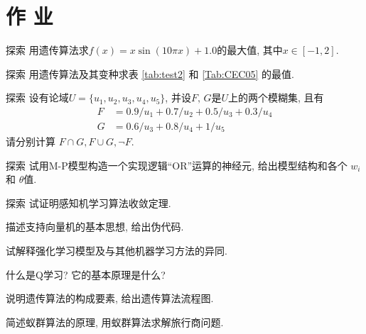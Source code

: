 \section{作      业}
\begin{custom}[explorecolor]{探索}
    用遗传算法求$f(x)=x\sin(10πx)+1.0$的最大值, 其中$x\in [-1,2]$.
\end{custom}
\begin{custom}[explorecolor]{探索}
    用遗传算法及其变种求表 \ref{tab:test2} 和 \ref{Tab:CEC05} 的最值.
\end{custom}
\begin{custom}[explorecolor]{探索}
设有论域$U=\{u_1, u_2, u_3, u_4, u_5\}$, 并设$F,\, G$是$U$上的两个模糊集, 且有
\begin{align*}
    F&=0.9/u_1+0.7/u_2+0.5/u_3+0.3/u_4\\
    G&=0.6/u_3+0.8/u_4+1/u_5
\end{align*}
请分别计算 $F\cap G, F\cup G,\neg F$.
\end{custom}
\begin{custom}[explorecolor]{探索}
    试用M-P模型构造一个实现逻辑``OR''运算的神经元, 给出模型结构和各个 $w_{i}$和 $\theta $值.
\end{custom}
\begin{custom}[explorecolor]{探索}
    试证明感知机学习算法收敛定理.
\end{custom}

\begin{think}
    描述支持向量机的基本思想, 给出伪代码.
\end{think}

\begin{think}
    试解释强化学习模型及与其他机器学习方法的异同.
\end{think}
\begin{think}
    什么是Q学习? 它的基本原理是什么?
\end{think}
\begin{think}
    说明遗传算法的构成要素, 给出遗传算法流程图.
\end{think}

\begin{think}
    简述蚁群算法的原理, 用蚁群算法求解旅行商问题.
\end{think}

